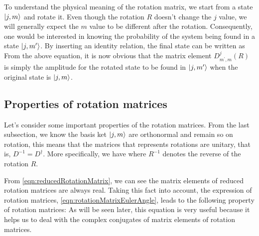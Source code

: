 To understand the physical meaning of the rotation matrix, we start from a state $| j, m \rangle$ and rotate it. Even though
the rotation $R$ doesn't change the $j$ value, we will generally expect the $m$ value to be different after the rotation. 
Consequently, one would be interested in knowing the probability of the system being found in a state $| j, m^{\prime} \rangle$. By inserting an identity relation, the final state can be written as
From the above equation, it is now obvious that the matrix element $D^{j}_{m^{\prime}, m}(R)$ is simply the amplitude for the rotated state to
be found in $| j, m^{\prime} \rangle$ when the original state is $| j, m \rangle$. 

\subsection{Properties of rotation matrices}

Let's consider some important properties of the rotation matrices. From the last subsection, we know  the basis ket 
$| j, m \rangle$ are orthonormal and remain so on rotation, this means that the matrices that represents rotations are
unitary, that is, $D^{-1} = D^{\dagger}$. More specifically, we have 
where $R^{-1}$ denotes the reverse of the rotation $R$. 

From \autoref{eqn:reducedRotationMatrix}, we can see the matrix elements of reduced rotation matrices are always
 real. Taking this fact into account, the expression of rotation matrices, \autoref{eqn:rotationMatrixEulerAngle}, leads to the following property of
rotation matrices:
As will be seen later, this equation is very useful because it helps us to deal with the complex conjugates of matrix 
elements of rotation matrices. 

